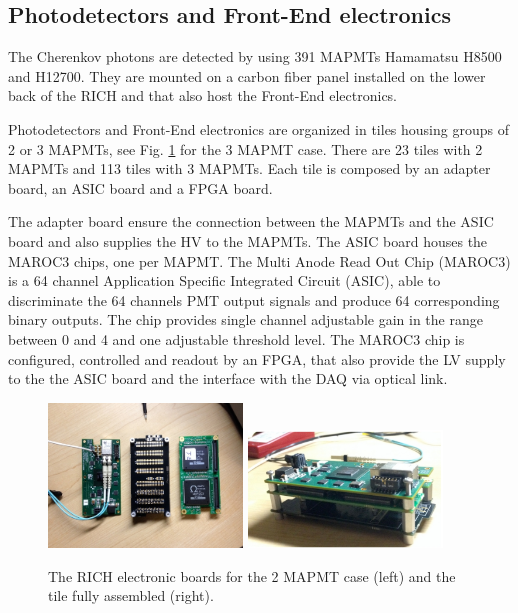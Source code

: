 \documentclass[12pt]{article}
\begin{document}
\subsection{Photodetectors and Front-End electronics}

The Cherenkov photons are detected by using 391 MAPMTs Hamamatsu H8500 and H12700.
They are mounted on a carbon fiber panel installed on the lower back of the RICH and that also host the Front-End electronics.

Photodetectors and Front-End electronics are organized in tiles housing groups of 2 or 3 MAPMTs, see Fig. \ref{fig:RICH_Electronics} for the 3 MAPMT case.
There are 23 tiles with 2 MAPMTs and 113 tiles with 3 MAPMTs.
Each tile is composed by an adapter board, an ASIC board and a FPGA board.

The adapter board ensure the connection between the MAPMTs and the ASIC board and also supplies the HV to the MAPMTs.
The ASIC board houses the MAROC3 chips, one per MAPMT.
The Multi Anode Read Out Chip (MAROC3) is a 64 channel Application Specific Integrated Circuit (ASIC), able to discriminate the 64 channels PMT output signals and produce 64 corresponding binary outputs. 
The chip provides single channel adjustable gain in the range between 0 and 4 and one adjustable threshold level.
The MAROC3 chip is configured, controlled and readout by an FPGA, that also provide the LV supply to the the ASIC board and the interface with the DAQ via optical link.



\begin{figure}[h!]
\center
\includegraphics[width=0.46\textwidth]{pics/RICH_ElectronicsBoards.jpg}
\includegraphics[width=0.46\textwidth]{pics/RICH_ElectronicsAssembled.jpg}
\caption{ \label{fig:RICH_Electronics} The RICH electronic boards for the 2 MAPMT case (left) and the tile fully assembled (right).}
\end{figure}
\end{document}
